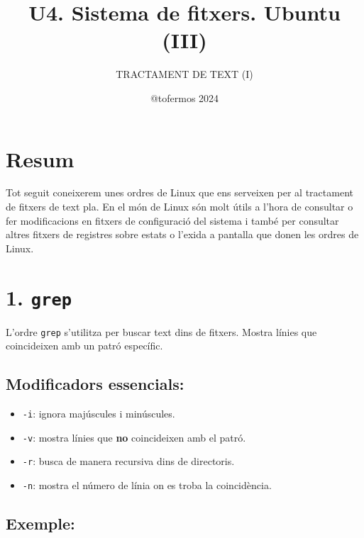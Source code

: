 \documentclass[
  12 pt,
  a4paper,
]{article}
\title{U4. Sistema de fitxers. Ubuntu (III)}
\subtitle{TRACTAMENT DE TEXT (I)}
\author{@tofermos 2024}
\date{}
\providecommand{\tightlist}{%
  \setlength{\itemsep}{0pt}\setlength{\parskip}{0pt}}
\begin{document}
\maketitle

{
\setcounter{tocdepth}{2}
\tableofcontents
}
\newpage
\renewcommand\tablename{Tabla}

\section{Resum}\label{resum}

Tot seguit coneixerem unes ordres de Linux que ens serveixen per al
tractament de fitxers de text pla. En el món de Linux són molt útils a
l'hora de consultar o fer modificacions en fitxers de configuració del
sistema i també per consultar altres fitxers de registres sobre estats o
l'exida a pantalla que donen les ordres de Linux.

\section{\texorpdfstring{1. \texttt{grep}}{1. grep}}\label{grep}

L'ordre \texttt{grep} s'utilitza per buscar text dins de fitxers. Mostra
línies que coincideixen amb un patró específic.

\subsection{Modificadors essencials:}\label{modificadors-essencials}

\begin{itemize}
\tightlist
\item
  \texttt{-i}: ignora majúscules i minúscules.
\item
  \texttt{-v}: mostra línies que \textbf{no} coincideixen amb el patró.
\item
  \texttt{-r}: busca de manera recursiva dins de directoris.
\item
  \texttt{-n}: mostra el número de línia on es troba la coincidència.
\end{itemize}

\subsection{Exemple:}\label{exemple}
\end{document}
